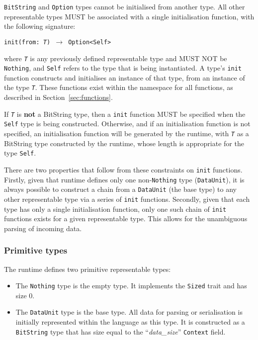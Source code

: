 \documentclass[10pt,twocolumn,a4paper]{article}
\newcommand{\code}[1]{\texttt{#1}}
\begin{document}
\code{BitString} and \code{Option} types cannot be initialised from another
type. All other representable types MUST be associated with a single initialisation
function, with the following signature:

\begin{center}
  \texttt{init(from: \emph{T}) $\rightarrow$ Option<Self>}
\end{center}

where \code{\emph{T}} is any previously defined representable type and MUST NOT
be \code{Nothing}, and \code{Self} refers to the type that is being instantiated.
A type's \code{init} function constructs and initialises an instance of that
type, from an instance of the type \code{\emph{T}}. These functions exist within
the namespace for all functions, as described in Section~\ref{sec:functions}.

If \code{\emph{T}} is \textbf{not} a BitString type, then a \code{init} function
MUST be specified when the \code{Self} type is being constructed. Otherwise, and
if an initialisation function is not specified,
an initialisation function will be generated by the runtime, with
\code{\emph{T}} as a BitString type constructed by the runtime, whose length is
appropriate for the type \code{Self}.

There are two properties that follow from these constraints on \code{init}
functions. Firstly, given that runtime defines only one non-\code{Nothing} type
(\code{DataUnit}), it is always possible to construct a chain from a
\code{DataUnit} (the base type) to any other representable type via a series of
\code{init} functions. Secondly, given that each type has only a single
initialisation function, only one such chain of \code{init} functions exists for
a given representable type. This allows for the unambiguous parsing of incoming
data.

\subsubsection{Primitive types}
\label{sec:representable-primitive}

The runtime defines two primitive representable types:

\begin{itemize}
  \item The \code{Nothing} type is the empty type. It implements the
    \code{Sized} trait and has size 0.

  \item The \code{DataUnit} type is the base type. All data for parsing or
    serialisation is initially represented within the language as this type.
    It is constructed as a \code{BitString} type that has size equal to the
    ``\emph{data\_size}'' \code{Context} field.
\end{itemize}
\end{document}

